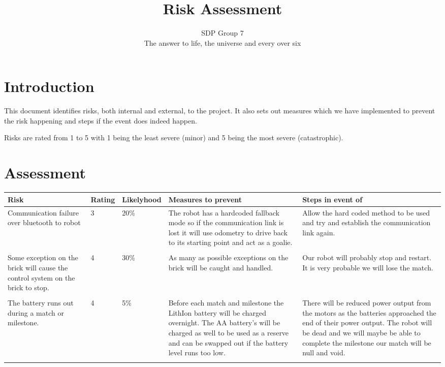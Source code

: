 \documentclass{article}
\begin{document}
\title{Risk Assessment}
\author{SDP Group 7\\
The answer to life, the universe and every over six
}
\maketitle

\section{Introduction}

This document identifies risks, both internal and external, to the project. It
also sets out measures which we have implemented to prevent the risk
happening and steps if the event does indeed happen.

Risks are rated from 1 to 5 with 1 being the least severe (minor) and 5 being
the most severe (catastrophic).

\section{Assessment}

\begin{landscape}

    \begin{tabular}{ p{4cm}  p{2cm} p{2cm} p{4cm} p{4cm} }
        Risk & Rating & Likelyhood & Measures to prevent & Steps in event of\\
        \hline

        Communication failure over bluetooth to robot &
        3 &
        20\% &
        The robot
        has a hardcoded fallback mode so if the communication link is lost it
        will use odometry to drive back to its starting point and act as
        a goalie. &
        Allow the hard coded method to be used and try and establish the
        communication link again.\\
        \\
        Some exception on the brick will cause the control system on the brick
        to stop. &
        4 &
        30\% &
        As many as possible exceptions on the brick will be caught and handled.
        &
        Our robot will probably stop and restart. It is very probable we will
        lose the match.\\
        \\
        The battery runs out during a match or milestone. &
        4 &
        5\% &
        Before each match and milestone the LithIon battery will be charged
        overnight. The AA battery's will be charged as well to be used as
        a reserve and can be swapped out if the battery level runs too low.&
        There will be reduced power output from the motors as the batteries
        approached the end of their power output. The robot will be dead and we
        will maybe be able to complete the milestone our match will be null and
        void.\\
        \\
        



    \end{tabular}
\end{landscape}
\end{document}
